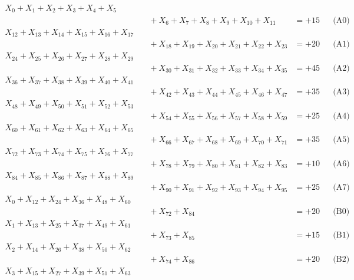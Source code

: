 \documentclass[a4paper,10pt]{article}
\begin{document}
\allowdisplaybreaks
{\small
\begin{align}
X_{0} + X_{1} + X_{2} + X_{3} + X_{4} + X_{5} \\[0.1ex]
&\quad  + X_{6} + X_{7} + X_{8} + X_{9} + X_{10} + X_{11} &= +15 && \text{(A0)} \\
X_{12} + X_{13} + X_{14} + X_{15} + X_{16} + X_{17} \\[0.1ex]
&\quad  + X_{18} + X_{19} + X_{20} + X_{21} + X_{22} + X_{23} &= +20 && \text{(A1)} \\
X_{24} + X_{25} + X_{26} + X_{27} + X_{28} + X_{29} \\[0.1ex]
&\quad  + X_{30} + X_{31} + X_{32} + X_{33} + X_{34} + X_{35} &= +45 && \text{(A2)} \\
X_{36} + X_{37} + X_{38} + X_{39} + X_{40} + X_{41} \\[0.1ex]
&\quad  + X_{42} + X_{43} + X_{44} + X_{45} + X_{46} + X_{47} &= +35 && \text{(A3)} \\
X_{48} + X_{49} + X_{50} + X_{51} + X_{52} + X_{53} \\[0.1ex]
&\quad  + X_{54} + X_{55} + X_{56} + X_{57} + X_{58} + X_{59} &= +25 && \text{(A4)} \\
\allowbreak
X_{60} + X_{61} + X_{62} + X_{63} + X_{64} + X_{65} \\[0.1ex]
&\quad  + X_{66} + X_{67} + X_{68} + X_{69} + X_{70} + X_{71} &= +35 && \text{(A5)} \\
X_{72} + X_{73} + X_{74} + X_{75} + X_{76} + X_{77} \\[0.1ex]
&\quad  + X_{78} + X_{79} + X_{80} + X_{81} + X_{82} + X_{83} &= +10 && \text{(A6)} \\
X_{84} + X_{85} + X_{86} + X_{87} + X_{88} + X_{89} \\[0.1ex]
&\quad  + X_{90} + X_{91} + X_{92} + X_{93} + X_{94} + X_{95} &= +25 && \text{(A7)} \\
X_{0} + X_{12} + X_{24} + X_{36} + X_{48} + X_{60} \\[0.1ex]
&\quad  + X_{72} + X_{84} &= +20 && \text{(B0)} \\
X_{1} + X_{13} + X_{25} + X_{37} + X_{49} + X_{61} \\[0.1ex]
&\quad  + X_{73} + X_{85} &= +15 && \text{(B1)} \\
\allowbreak
X_{2} + X_{14} + X_{26} + X_{38} + X_{50} + X_{62} \\[0.1ex]
&\quad  + X_{74} + X_{86} &= +20 && \text{(B2)} \\
X_{3} + X_{15} + X_{27} + X_{39} + X_{51} + X_{63} \\[0.1ex]

\end{align}}
\end{document}
